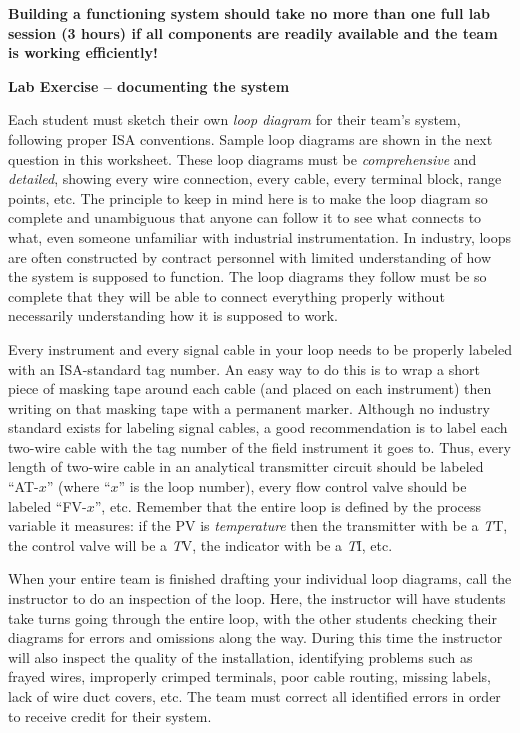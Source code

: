 \vskip 10pt

{\bf Building a functioning system should take no more than one full lab session (3 hours) if all components are readily available and the team is working efficiently!}





\vfil \eject

\noindent
{\bf Lab Exercise -- documenting the system}

\vskip 5pt

Each student must sketch their own {\it loop diagram} for their team's system, following proper ISA conventions.  Sample loop diagrams are shown in the next question in this worksheet.  These loop diagrams must be {\it comprehensive} and {\it detailed}, showing every wire connection, every cable, every terminal block, range points, etc.  The principle to keep in mind here is to make the loop diagram so complete and unambiguous that anyone can follow it to see what connects to what, even someone unfamiliar with industrial instrumentation.  In industry, loops are often constructed by contract personnel with limited understanding of how the system is supposed to function.  The loop diagrams they follow must be so complete that they will be able to connect everything properly without necessarily understanding how it is supposed to work.

Every instrument and every signal cable in your loop needs to be properly labeled with an ISA-standard tag number.  An easy way to do this is to wrap a short piece of masking tape around each cable (and placed on each instrument) then writing on that masking tape with a permanent marker.  Although no industry standard exists for labeling signal cables, a good recommendation is to label each two-wire cable with the tag number of the field instrument it goes to.  Thus, every length of two-wire cable in an analytical transmitter circuit should be labeled ``AT-$x$'' (where ``$x$'' is the loop number), every flow control valve should be labeled ``FV-$x$'', etc.  Remember that the entire loop is defined by the process variable it measures: if the PV is {\it temperature} then the transmitter with be a {\it T}T, the control valve will be a {\it T}V, the indicator with be a {\it T}I, etc.

When your entire team is finished drafting your individual loop diagrams, call the instructor to do an inspection of the loop.  Here, the instructor will have students take turns going through the entire loop, with the other students checking their diagrams for errors and omissions along the way.  During this time the instructor will also inspect the quality of the installation, identifying problems such as frayed wires, improperly crimped terminals, poor cable routing, missing labels, lack of wire duct covers, etc.  The team must correct all identified errors in order to receive credit for their system.  

